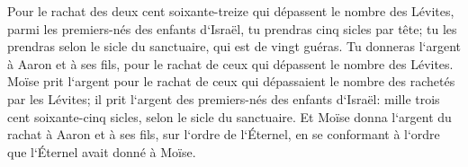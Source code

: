 \verse Pour le rachat des deux cent soixante-treize qui dépassent le nombre des Lévites, parmi les premiers-nés des enfants d`Israël, 
\verse tu prendras cinq sicles par tête; tu les prendras selon le sicle du sanctuaire, qui est de vingt guéras. 
\verse Tu donneras l`argent à Aaron et à ses fils, pour le rachat de ceux qui dépassent le nombre des Lévites. 
\verse Moïse prit l`argent pour le rachat de ceux qui dépassaient le nombre des rachetés par les Lévites; 
\verse il prit l`argent des premiers-nés des enfants d`Israël: mille trois cent soixante-cinq sicles, selon le sicle du sanctuaire. 
\verse Et Moïse donna l`argent du rachat à Aaron et à ses fils, sur l`ordre de l`Éternel, en se conformant à l`ordre que l`Éternel avait donné à Moïse. 

